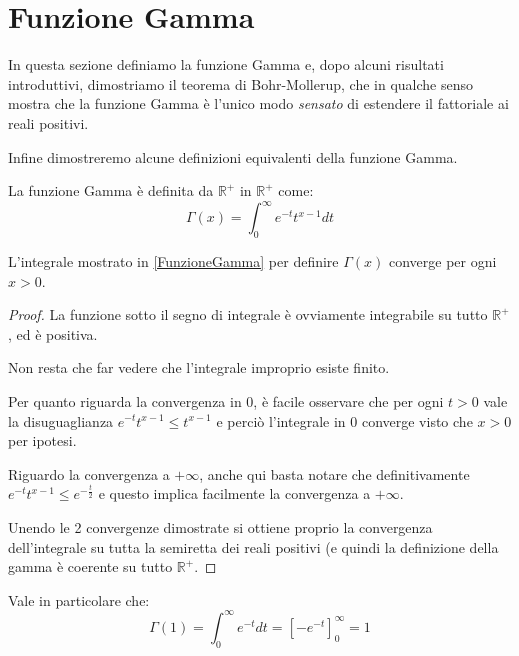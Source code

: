\section{Funzione Gamma}
In questa sezione definiamo la funzione Gamma e, dopo alcuni risultati introduttivi, dimostriamo il teorema di Bohr-Mollerup, che
in qualche senso mostra che la funzione Gamma è l'unico modo \emph{sensato} di estendere il fattoriale ai reali positivi.

Infine dimostreremo alcune definizioni equivalenti della funzione Gamma.

\begin{definition}\label{FunzioneGamma} 
	La funzione Gamma è definita da $\mathbb{R^+}$ in $\mathbb{R^+}$ come:
	\begin{equation*}
		\Gamma(x)=\int_0^{\infty}{e^{-t}t^{x-1}dt}
	\end{equation*}
\end{definition}

\begin{lemma}\label{GammaConverge}
	L'integrale mostrato in \cref{FunzioneGamma} per definire $\Gamma(x)$ converge per ogni $x>0$.
\end{lemma}
\begin{proof}
	La funzione sotto il segno di integrale è ovviamente integrabile su tutto $\mathbb{R^+}$, ed è positiva.
	
	Non resta che far vedere che l'integrale improprio esiste finito.
	
	Per quanto riguarda la convergenza in 0, è facile osservare che per ogni $t>0$ vale la disuguaglianza $e^{-t}t^{x-1}\le t^{x-1}$ 
	e perciò l'integrale in $0$ converge visto che $x>0$ per ipotesi.
	
	Riguardo la convergenza a $+\infty$, anche qui basta notare che definitivamente $e^{-t}t^{x-1}\le e^{-\frac t2}$
	e questo implica facilmente la convergenza a $+\infty$.
	
	Unendo le 2 convergenze dimostrate si ottiene proprio la convergenza dell'integrale su tutta la semiretta dei reali positivi (e quindi la 
	definizione della gamma è coerente su tutto $\mathbb{R^+}$.
\end{proof}


\begin{remark}\label{ValoreGamma1}
	Vale in particolare che:
	\begin{equation*}
		\Gamma(1)=\int_0^{\infty}{e^{-t}dt}=\left[-e^{-t}\right]_0^{\infty}=1
	\end{equation*}
\end{remark}


